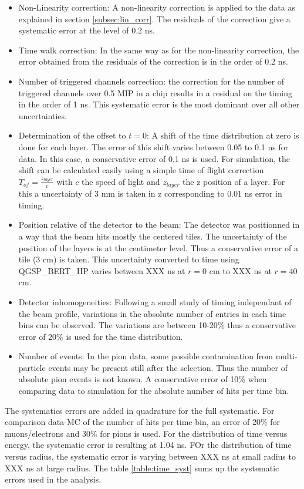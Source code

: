 \begin{itemize}
	\item Non-Linearity correction: A non-linearity correction is applied to the data as explained in section \ref{subsec:lin_corr}. The residuals of the correction give a systematic error at the level of 0.2 ns.
	\item Time walk correction: In the same way as for the non-linearity correction, the error obtained from the residuals of the correction is in the order of 0.2 ns.
	\item Number of triggered channels correction: the correction for the number of triggered channels over 0.5 MIP in a chip results in a residual on the timing in the order of 1 ns. This systematic error is the most dominant over all other uncertainties.
	\item Determination of the offset to $t=0$: A shift of the time distribution at zero is done for each layer. The error of this shift varies between 0.05 to 0.1 ns for data. In this case, a conservative error of 0.1 ns is used. For simulation, the shift can be calculated easily using a simple time of flight correction $T_{of} = \frac{z_{layer}}{c}$ with $c$ the speed of light and $z_{layer}$ the z position of a layer. For this a uncertainty of 3 mm is taken in z corresponding to 0.01 ns error in timing.
	\item Position relative of the detector to the beam: The detector was positionned in a way that the beam hits mostly the centered tiles. The uncertainty of the position of the layers is at the centimeter level. Thus a conservative error of a tile (3 cm) is taken. This uncertainty converted to time using QGSP\_BERT\_HP varies between XXX ns at $r = 0$ cm to XXX ns at $r = 40$ cm.
	\item Detector inhomogeneities: Following a small study of timing independant of the beam profile, variations in the absolute number of entries in each time bins can be observed. The variations are between 10-20\% thus a conservative error of 20\% is used for the time distribution.
	\item Number of events: In the pion data, some possible contamination from multi-particle events may be present still after the selection. Thus the number of absolute pion events is not known. A conservative error of 10\% when comparing data to simulation for the absolute number of hits per time bin.
\end{itemize}

The systematics errors are added in quadrature for the full systematic. For comparison data-MC of the number of hits per time bin, an error of 20\% for muons/electrons and 30\% for pions is used. For the distribution of time versus energy, the systematic error is resulting at 1.04 ns. FOr the distribution of time versus radius, the systematic error is varying between XXX ns at small radius to XXX ns at large radius. The table \ref{table:time_syst} sums up the systematic errors used in the analysis.

